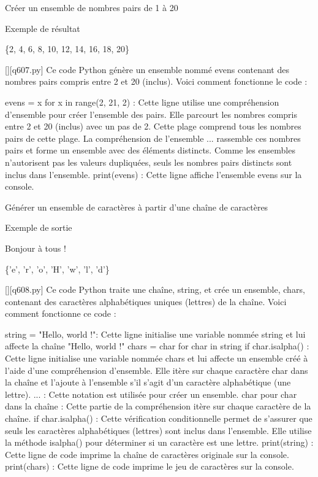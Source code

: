         \question
        Créer un ensemble de nombres pairs de 1 à 20

Exemple de résultat

\{2, 4, 6, 8, 10, 12, 14, 16, 18, 20\}
        \par
        \begin{solution}
            \renewcommand{\nomfichier}{q607.py}
            \pythonfile{\chemincode \nomfichier}[][\nomfichier]
            Ce code Python génère un ensemble nommé evens contenant des nombres pairs compris entre 2 et 20 (inclus). Voici comment fonctionne le code :

    evens = {x for x in range(2, 21, 2)} : Cette ligne utilise une compréhension d'ensemble pour créer l'ensemble des pairs. Elle parcourt les nombres compris entre 2 et 20 (inclus) avec un pas de 2. Cette plage comprend tous les nombres pairs de cette plage.
    La compréhension de l'ensemble {...} rassemble ces nombres pairs et forme un ensemble avec des éléments distincts. Comme les ensembles n'autorisent pas les valeurs dupliquées, seuls les nombres pairs distincts sont inclus dans l'ensemble.
    print(evens) : Cette ligne affiche l'ensemble evens sur la console.
        \end{solution}
        

        \question
        Générer un ensemble de caractères à partir d'une chaîne de caractères

Exemple de sortie

Bonjour à tous !

\{'e', 'r', 'o', 'H', 'w', 'l', 'd'\}
        \par
        \begin{solution}
            \renewcommand{\nomfichier}{q608.py}
            \pythonfile{\chemincode \nomfichier}[][\nomfichier]
            Ce code Python traite une chaîne, string, et crée un ensemble, chars, contenant des caractères alphabétiques uniques (lettres) de la chaîne. Voici comment fonctionne ce code :

    string = "Hello, world !": Cette ligne initialise une variable nommée string et lui affecte la chaîne "Hello, world !"
    chars = {char for char in string if char.isalpha()} : Cette ligne initialise une variable nommée chars et lui affecte un ensemble créé à l'aide d'une compréhension d'ensemble. Elle itère sur chaque caractère char dans la chaîne et l'ajoute à l'ensemble s'il s'agit d'un caractère alphabétique (une lettre).
        {...} : Cette notation est utilisée pour créer un ensemble.
        char pour char dans la chaîne : Cette partie de la compréhension itère sur chaque caractère de la chaîne.
        if char.isalpha() : Cette vérification conditionnelle permet de s'assurer que seuls les caractères alphabétiques (lettres) sont inclus dans l'ensemble. Elle utilise la méthode isalpha() pour déterminer si un caractère est une lettre.
    print(string) : Cette ligne de code imprime la chaîne de caractères originale sur la console.
    print(chars) : Cette ligne de code imprime le jeu de caractères sur la console.
        \end{solution}
        

